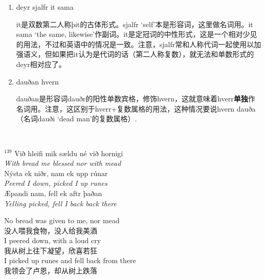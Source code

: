 \begin{grammar*}{}
    \begin{enumerate}[leftmargin=*]

        \item deyr sjalfr it sama

              it是双数第二人称þit的古体形式。sjalfr `self'本是形容词，这里做名词用。it sama
              `the same, likewise'作副词。it是定冠词的中性形式，这是一个相对少见的用法，不过和英语中的情况是一致。注意，sjalfr常和人称代词一起使用以加强语义，但如果把it认为是代词的话（第二人称复数），就无法和单数形式的deyr相对应了。

        \item dauðan hvern

              dauðan是形容词dauðr的阳性单数宾格，修饰hvern，这就意味着hverr\textbf{单独}作名词用。注意，这区别于hverr+复数属格的用法，这种情况要说hvern dauða（名词dauði `dead man'的复数属格）.

    \end{enumerate}
\end{grammar*}
\hspace*{\fill}\\ %
\begin{paracol}{2}
    \noindent
    $^{139}$ Við hleifi mik sældu né við hornigi\\
    \textit{With bread me blessed nor with mead}\\
    Nýsta ek niðr, nam ek upp rúnar\\
    \textit{Peered I down, picked I up runes}\\
    \MakeUppercase æpandi nam, fell ek aftr þaðan\\
    \textit{Yelling picked, fell I back back there}\\
    \switchcolumn

    \noindent
    No bread was given to me, nor mead\\
    没人喂我食物，没人给我美酒\\
    I peered down, with a loud cry\\
    我从树上往下凝望，欣喜若狂\\
    I picked up runes and fell back from there\\
    我领会了卢恩，却从树上跌落\\

\end{paracol}

